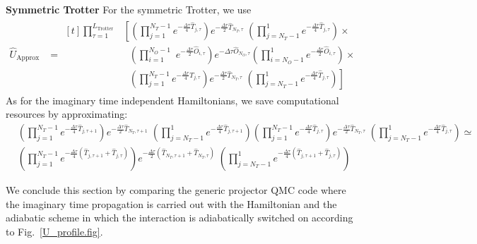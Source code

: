 \noindent
\textbf{Symmetric Trotter} 
For  the symmetric  Trotter,   we  use
\begin{align}
\label{eq:f_approx_symm_T} 
\hat{U}_{\text{Approx} }  &=  
\begin{aligned}[t]
    \prod_{\tau=1}^{L_{\text{Trotter}}} &\left[ \left(\prod_{j=1}^{N_T-1} e^{-\frac{\Delta \tau}{4} \hat{T}_{j,\tau} } \right)    e^{-\frac{\Delta \tau}{2} \hat{T}_{N_T,\tau} } \;   
   \left(  \prod_{j=N_T-1}^{1} e^{-\frac{\Delta \tau}{4} \hat{T}_{j,\tau} } \right)  \times   \right. \nonumber \\   
   &\;\;\left(\prod_{i=1\phantom{N_O}}^{N_O-1} e^{-\frac{\Delta \tau}{2} \hat{O}_{i,\tau} } \right)    e^{-\Delta \tau \hat{O}_{N_O,\tau} }    
     \left( \prod_{i=N_O-1}^{1} e^{-\frac{\Delta \tau}{2} \hat{O}_{i,\tau} } \right)  \times  \nonumber  \\
   &\;\;\left.   \left(\prod_{j=1}^{N_T-1} e^{-\frac{\Delta \tau}{4} \hat{T}_{j,\tau} } \right)    e^{-\frac{\Delta \tau}{2} \hat{T}_{N_T,\tau} }  \;  
   \left(  \prod_{j=N_T-1}^{1} e^{-\frac{\Delta \tau}{4} \hat{T}_{j,\tau} } \right)   
   \right] 
   \end{aligned}
\end{align}
As  for  the   imaginary  time independent  Hamiltonians,  we  save  computational  resources  by  approximating: 
\begin{align}
  & \left(\prod_{j=1}^{N_T-1} e^{-\frac{\Delta \tau}{4} \hat{T}_{j,\tau+1} } \right)    e^{-\frac{\Delta \tau}{2} \hat{T}_{N_T,\tau+1} }  \;  
   \left(  \prod_{j=N_T-1}^{1} e^{-\frac{\Delta \tau}{4} \hat{T}_{j,\tau+1} } \right)    
    \left(\prod_{j=1}^{N_T-1} e^{-\frac{\Delta \tau}{4} \hat{T}_{j,\tau} } \right)    e^{-\frac{\Delta \tau}{2} \hat{T}_{N_T,\tau} }  \;  
   \left(  \prod_{j=N_T-1}^{1} e^{-\frac{\Delta \tau}{4} \hat{T}_{j,\tau} } \right)       \simeq  \nonumber  \\
    & \left(\prod_{j=1}^{N_T-1} e^{-\frac{\Delta \tau}{4} ( \hat{T}_{j,\tau+1}  +  \hat{T}_{j,\tau} )} \right)    e^{-\frac{\Delta \tau}{2} ( \hat{T}_{N_T,\tau+1} 
     +  \hat{T}_{N_T,\tau}  ) }  \;  
   \left(  \prod_{j=N_T-1}^{1} e^{-\frac{\Delta \tau}{4} ( \hat{T}_{j,\tau+1}  +  \hat{T}_{j,\tau} ) } \right)    
\end{align}

We  conclude  this     section by  comparing  the   generic   projector  QMC code    where  the imaginary  time propagation  is   carried out  with   the 
Hamiltonian  and  the  adiabatic   scheme   in   which  the interaction is  adiabatically  switched on according  to  Fig.~\ref{U_profile.fig}.   

